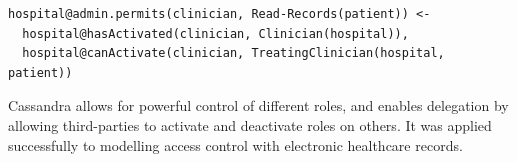 \documentclass[thesis.tex]{subfiles}
\begin{document}
\begin{lstlisting}
hospital@admin.permits(clinician, Read-Records(patient)) <-
  hospital@hasActivated(clinician, Clinician(hospital)),
  hospital@canActivate(clinician, TreatingClinician(hospital, patient))
\end{lstlisting}

Cassandra allows for powerful control of different roles, and enables
delegation by allowing third-parties to activate and deactivate roles
on others.  It was applied successfully to modelling access control
with electronic healthcare records.
\end{document}
